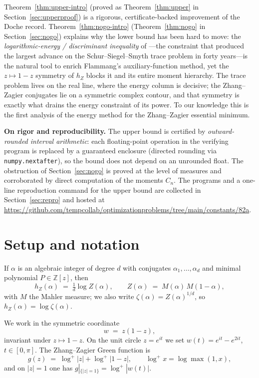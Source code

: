 \documentclass[11pt,reqno]{amsart}
\theoremstyle{plain}
\theoremstyle{definition}
\newcommand{\Z}{\mathbb{Z}}
\newcommand{\hZ}{h_Z}
\newcommand{\repo}{\url{https://github.com/tempcollab/optimizationproblems/tree/main/constants/82a}}
\begin{document}
Theorem~\ref{thm:upper-intro} (proved as Theorem~\ref{thm:upper} in
Section~\ref{sec:upperproof}) is a rigorous, certificate-backed improvement of the
Doche record. Theorem~\ref{thm:nogo-intro} (Theorem~\ref{thm:nogo} in
Section~\ref{sec:nogo}) explains why the lower bound has been hard to move: the
\emph{logarithmic-energy / discriminant inequality} of \citet{OSS}---the
constraint that produced the largest advance on the Schur--Siegel--Smyth trace
problem in forty years---is the natural tool to enrich Flammang's
auxiliary-function method, yet the $z\mapsto1-z$ symmetry of $\hZ$ blocks it and
its entire moment hierarchy. The trace problem lives on the real line, where the
energy column is decisive; the Zhang--Zagier conjugates lie on a symmetric complex
contour, and that symmetry is exactly what drains the energy constraint of its
power. To our knowledge this is the first analysis of the energy method for the
Zhang--Zagier essential minimum.

\medskip
\noindent\textbf{On rigor and reproducibility.}
The upper bound is certified by \emph{outward-rounded interval arithmetic}: each
floating-point operation in the verifying program is replaced by a guaranteed
enclosure (directed rounding via \texttt{numpy.nextafter}), so the bound does not
depend on an unrounded float. The obstruction of Section~\ref{sec:nogo} is proved
at the level of measures and corroborated by direct computation of the moments
$C_n$. The programs and a one-line reproduction command for the upper bound are
collected in Section~\ref{sec:repro} and hosted at \repo.

\section{Setup and notation}\label{sec:setup}

If $\alpha$ is an algebraic integer of degree $d$ with conjugates
$\alpha_1,\dots,\alpha_d$ and minimal polynomial $P\in\Z[z]$, then
\[
  \hZ(\alpha)\;=\;\tfrac1d\log Z(\alpha),\qquad
  Z(\alpha)\;=\;M(\alpha)\,M(1-\alpha),
\]
with $M$ the Mahler measure; we also write $\zeta(\alpha)=Z(\alpha)^{1/d}$, so
$\hZ(\alpha)=\log\zeta(\alpha)$.

We work in the symmetric coordinate
\[
  w\;=\;z(1-z),
\]
invariant under $z\mapsto 1-z$. On the unit circle $z=e^{it}$ we set
$w(t)=e^{it}-e^{2it}$, $t\in[0,\pi]$. The Zhang--Zagier Green function is
\[
  g(z)\;=\;\log^+|z|+\log^+|1-z|,\qquad \log^+x=\log\max(1,x),
\]
and on $|z|=1$ one has $g|_{\{|z|=1\}}=\log^+|w(t)|$.
\end{document}
